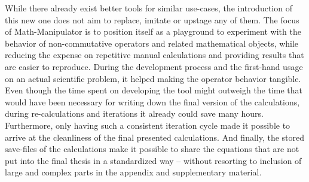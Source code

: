 While there already exist better tools for similar use-cases, the introduction of this new one does not aim to replace, imitate or upstage any of them.
The focus of Math-Manipulator is to position itself as a playground to experiment with the behavior of non-commutative operators and related mathematical objects, while reducing the expense on repetitive manual calculations and providing results that are easier to reproduce.
During the development process and the first-hand usage on an actual scientific problem, it helped making the operator behavior tangible.
Even though the time spent on developing the tool might outweigh the time that would have been necessary for writing down the final version of the calculations, during re-calculations and iterations it already could save many hours.
Furthermore, only having such a consistent iteration cycle made it possible to arrive at the cleanliness of the final presented calculations.
And finally, the stored save-files of the calculations make it possible to share the equations that are not put into the final thesis in a standardized way -- without resorting to inclusion of large and complex parts in the appendix and supplementary material.
